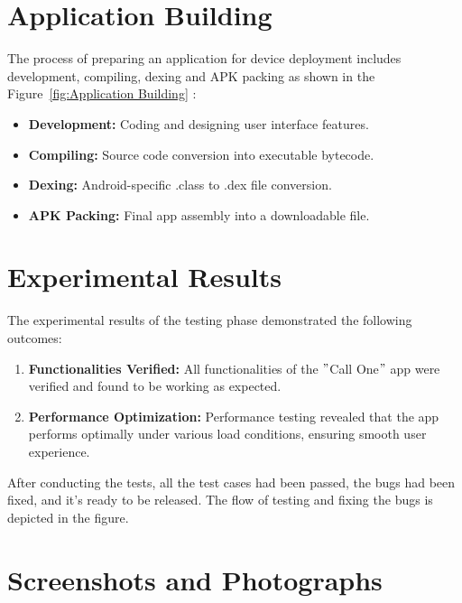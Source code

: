 \section{Application Building}\label{sec:app-building}

The process of preparing an application for device deployment includes development, compiling, dexing and  APK packing as shown in the Figure~\ref{fig:Application Building} :

\begin{itemize}
    \item \textbf{Development:} Coding and designing user interface features.
    \item \textbf{Compiling:} Source code conversion into executable bytecode.
    \item \textbf{Dexing:} Android-specific .class to .dex file conversion.
    \item \textbf{APK Packing:} Final app assembly into a downloadable file.
\end{itemize}

\section{Experimental Results}\label{sec:experimental-results}

The experimental results of the testing phase demonstrated the following outcomes:

\begin{enumerate}[label=\roman*.]
    \item \textbf{Functionalities Verified:} All functionalities of the \("\)Call One\("\) app were verified and found to be working as expected.

    \item \textbf{Performance Optimization:} Performance testing revealed that the app performs optimally under various load conditions, ensuring smooth user experience.

\end{enumerate}

After conducting the tests, all the test cases had been passed, the bugs had been fixed, and it's ready to be released.
The flow of testing and fixing the bugs is depicted in the figure.

\section{Screenshots and Photographs}\label{sec:Screenshots od Application Interface}

